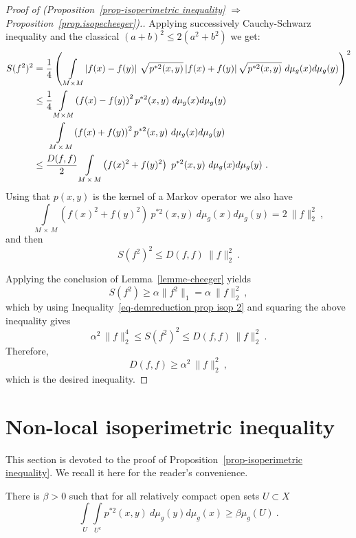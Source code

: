 \documentclass[AHL,Unicode,longabstracts,published]{cedram}
\newcommand{\inte}[1]{\underset{#1}{\int}}
\begin{document}
\begin{proof}[{Proof of (Proposition~\ref{prop-isoperimetric inequality} $\Rightarrow$ Proposition~\ref{prop.isopecheeger}).}]
Applying successively Cauchy-Schwarz inequality and the classical $(a+b)^2\leq 2(a^2+b^2)$ we get:
\begin{align*}
S(f^2)^2 &= \frac{1}{4} \left(\inte{M \times M} \left|f(x) -f(y)\right| \, \sqrt{p^{*2}(x,y)} \left|f(x) + f(y)\right| \sqrt{p^{*2}(x,y)} \ d \mu_g(x) d \mu_g(y) \right)^2 \\
&\leq \frac{1}{4} \inte{M \times M} \left(f(x)-f(y)\right)^2 p^{*2}(x,y) \ d \mu_g(x) d \mu_g(y) \\
&\mkern30mu \inte{M\,\times\,M} \left(f(x)+f(y)\right)^2 p^{*2}(x,y) \ d \mu_g(x) d \mu_g(y) \\
&\leq \frac{D(f,f)}{2} \inte{M\,\times\,M}\left(f(x)^2+f(y)^2\right) \ p^{*2}(x,y) \ d \mu_g(x) d \mu_g(y) \ . 
\end{align*}
Using that $p(x,y)$ is the kernel of a Markov operator we also have
\[
\inte{M\,\times\,M}\left(f(x)^2+f(y)^2\right) \ p^{*2}(x,y) \ d \mu_g(x) d \mu_g(y) = 2 \ \| f \|_{2}^2 \ ,
\]
and then
\begin{equation}\label{eq-demreduction prop isop 2}
S(f^2)^2 \leq D(f,f) \ \|f\|^2_2 \ .
\end{equation}

Applying the conclusion of Lemma~\ref{lemme-cheeger} yields
\[
S(f^2) \geq \alpha \|f^2\|_1 = \alpha \ \|f\|_2^2 \ ,
\]
which by using Inequality~\eqref{eq-demreduction prop isop 2} and squaring the above inequality gives
\[
\alpha^2 \ \|f\|_2^4 \le S(f^2)^2 \leq D(f,f) \ \|f\|^2_2 \ .
\]
Therefore,
\[
D(f,f) \ge \alpha^2 \ \|f\|_2^2 \ ,
\]
which is the desired inequality.
\end{proof}



\section{Non-local isoperimetric inequality}\label{sec-proof of isop}

This section is devoted to the proof of Proposition~\ref{prop-isoperimetric inequality}. We recall it here for the reader's convenience.

\begin{prop}\label{prop-isoper dem}
There is $\beta>0$ such that for all relatively compact open sets $U\subset X$
\[
\inte{U} \inte{U^c} p^{*2}(x,y) \ d \mu_g(y) d \mu_g(x) \geq \beta \mu_g (U)\ .
\]
\end{prop}
\end{document}
